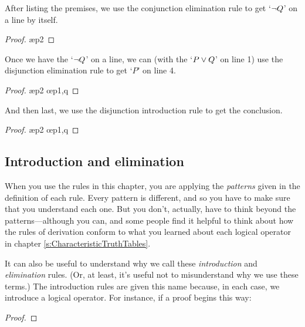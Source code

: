 After listing the premises, we use the conjunction elimination rule to get `${\neg} Q$' on a line by itself. 
\begin{proof}
	 \pr{}
	 \pr{}
	 \ae{p2}
\end{proof}
Once we have the `${\neg} Q$' on a line, we can (with the `$P \vee Q$' on line 1) use the disjunction elimination rule to get `$P$' on line 4.
\begin{proof}
	 \pr{}
	 \pr{}
	 \ae{p2}
	 \oe{p1,q}
\end{proof}
And then last, we use the disjunction introduction rule to get the conclusion.
\begin{proof}
	 \pr{}
	 \pr{}
	 \ae{p2}
	 \oe{p1,q}
	 
\end{proof}



\subsection{Introduction and elimination}
When you use the rules in this chapter, you are applying the \textit{patterns} given in the definition of each rule. Every pattern is different, and so you have to make sure that you understand each one. But you don't, actually, have to think beyond the patterns---although you can, and some people find it helpful to think about how the rules of derivation conform to what you learned about each logical operator in chapter \ref{s:CharacteristicTruthTables}.

It can also be useful to understand why we call these \textit{introduction} and \textit{elimination} rules. (Or, at least, it's useful not to misunderstand why we use these terms.) The introduction rules are given this name because, in each case, we introduce a logical operator. For instance, if a proof begins this way: 

\begin{proof}
	 \pr{}
	 \pr{}
\end{proof}

